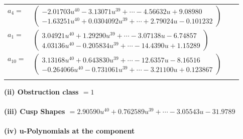 \documentclass[1p]{elsarticle_modified}
\theoremstyle{definition}
\begin{document}
\begin{tabular}{m{7pt} m{180pt} m{7pt} m{180pt} }
\flushright $a_{4}=$&$\begin{pmatrix}-2.01703 u^{40}-3.13071 u^{39}+\cdots-4.56632 u+9.08980\\-1.63251 u^{40}+0.0304092 u^{39}+\cdots+2.79024 u-0.101232\end{pmatrix}$ \\
\flushright $a_{1}=$&$\begin{pmatrix}3.04921 u^{40}+1.29290 u^{39}+\cdots-3.07138 u-6.74857\\4.03136 u^{40}-0.205834 u^{39}+\cdots-14.4390 u+1.15289\end{pmatrix}$ \\
\flushright $a_{10}=$&$\begin{pmatrix}3.13168 u^{40}+0.643830 u^{39}+\cdots-12.6357 u-8.16516\\-0.264066 u^{40}-0.731061 u^{39}+\cdots-3.21100 u+0.123867\end{pmatrix}$\\&\end{tabular}
\flushleft \textbf{(ii) Obstruction class $= 1$}\\~\\
\flushleft \textbf{(iii) Cusp Shapes $= 2.90590 u^{40}+0.762589 u^{39}+\cdots-3.05543 u-31.9789$}\\~\\
\newpage\renewcommand{\arraystretch}{1}
\flushleft \textbf{(iv) u-Polynomials at the component}\newline \\
\end{document}
